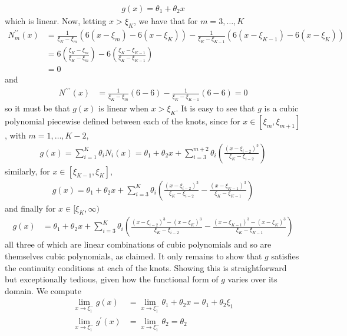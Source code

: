 \documentclass[10pt]{article}
\newcommand{\bp}[1]{\left({#1}\right)}
\newcommand{\1}[1]{\mathbbm{1}_{#1}}
\begin{document}
    \begin{align*} 
        g(x)=\theta_1+\theta_2x
    \end{align*}
    which is linear. Now, letting $x>\xi_K$, we have that for $m=3,\dots,K$
    \begin{align*}
        N_m^{\prime\prime}(x)&=\frac{1}{\xi_K-\xi_m}\bp{6(x-\xi_m)-6(x-\xi_K)}-\frac{1}{\xi_K-\xi_{K-1}}\bp{6(x-\xi_{K-1})-6(x-\xi_K)}\\
        &=6\bp{\frac{\xi_K-\xi_m}{\xi_K-\xi_m}}-6\bp{\frac{\xi_K-\xi_{K-1}}{\xi_K-\xi_{K-1}}}\\
        &=0
    \end{align*}
    and
    \begin{align*}
        N^{\prime\prime\prime}(x)&=\frac{1}{\xi_{K}-\xi_m}(6-6)-\frac{1}{\xi_K-\xi_{K-1}}(6-6)=0
    \end{align*}
    so it must be that $g(x)$ is linear when $x>\xi_K$. It is easy to see that $g$ is a cubic polynomial piecewise defined between each of the knots, since for $x\in[\xi_m,\xi_{m+1}]$, with $m=1,\dots,K-2$,
    \begin{align*}
        g(x)=\sum_{i=1}^K\theta_iN_i(x)=\theta_1+\theta_2x+\sum_{i=3}^{m+2}\theta_i\bp{\frac{(x-\xi_{i-2})^3}{\xi_K-\xi_{i-2}}}
    \end{align*}
    similarly, for $x\in[\xi_{K-1},\xi_K]$,
    \begin{align*}
        g(x)=\theta_1+\theta_2x+\sum_{i=3}^{K}\theta_i\bp{\frac{(x-\xi_{i-2})^3}{\xi_K-\xi_{i-2}}-\frac{(x-\xi_{K-1})^3}{\xi_K-\xi_{K-1}}}
    \end{align*}
    and finally for $x\in [\xi_{K},\infty)$
    \begin{align*}
        g(x)&=\theta_1+\theta_2x+\sum_{i=3}^K\theta_i\bp{\frac{(x-\xi_{i-2})^3-(x-\xi_K)^3}{\xi_K-\xi_{i-2}}-\frac{(x-\xi_{K-1})^3-(x-\xi_K)^3}{\xi_K-\xi_{K-1}}}
    \end{align*}
    all three of which are linear combinations of cubic polynomials and so are themselves cubic polynomials, as claimed. It only remains to show that $g$ satisfies the continuity conditions at each of the knots. 
    Showing this is straightforward but exceptionally tedious, given how the functional form of $g$ varies over its domain. We compute
    \begin{align*}
        \lim_{x\rightarrow\xi_1^-}g(x)&=\lim_{x\rightarrow\xi_1^-}\theta_1+\theta_2x=\theta_1+\theta_2\xi_1\\
        \lim_{x\rightarrow\xi_1^-}g^\prime(x)&=\lim_{x\rightarrow\xi_1^-}\theta_2=\theta_2
    \end{align*}
\end{document}
